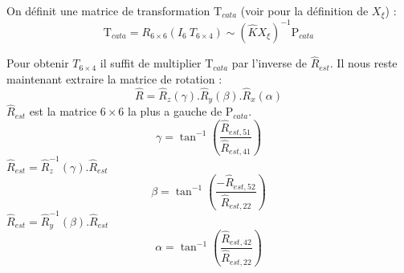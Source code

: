 
On définit une matrice de transformation $\text{T}_{cata}$ (voir \cite{Puig11PhD} pour la définition de $X_\xi$) :
\begin{equation}
\text{T}_{cata} = R_{6\times6} \left(I_6~T_{6\times4} \right) \sim (\hat{K}X_\xi )^{-1} \text{P}_{cata}
\end{equation}

Pour obtenir $T_{6\times4}$ il suffit de multiplier $\text{T}_{cata}$ par l'inverse de $\hat{R}_{est}$.
Il nous reste maintenant extraire la matrice de rotation :
\begin{equation}
\hat{R} = \hat{R}_z(\gamma).\hat{R}_y(\beta).\hat{R}_x(\alpha)
\end{equation}
$\hat{R}_{est}$ est la matrice $6\times6$ la plus a gauche de $\text{P}_{cata}$.
\begin{equation}
\gamma = \tan^{-1}\left(\frac{\hat{R}_{est,51}}{\hat{R}_{est,41}}\right)
\end{equation}
$\hat{R}_{est} = \hat{R}_z^{-1}(\gamma).\hat{R}_{est}$
\begin{equation}
\beta = \tan^{-1}\left(\frac{-\hat{R}_{est,52}}{\hat{R}_{est,22}}\right)
\end{equation}
$\hat{R}_{est} = \hat{R}_y^{-1}(\beta).\hat{R}_{est}$
\begin{equation}
\alpha = \tan^{-1}\left(\frac{\hat{R}_{est,42}}{\hat{R}_{est,22}}\right)
\end{equation}


